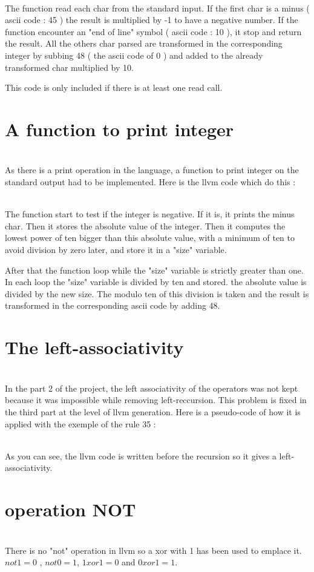 \documentclass[a4paper,10pt]{report}
\begin{document}


\hfill \\
The function read each char from the standard input. If the first char is a minus ( ascii code : 45 ) the result is multiplied by -1 to have a negative number. If the function encounter an "end of line" symbol ( ascii code : 10 ), it stop and return the result. All the others char parsed are transformed in the corresponding integer by subbing 48 ( the ascii code of 0 ) and added to the already transformed char multiplied by 10.

This code is only included if there is at least one read call.

\section*{A function to print integer}

\hfill \\
As there is a print operation in the language, a function to print integer on the standard output had to be implemented. Here is the llvm code which do this :



\hfill \\
The function start to test if the integer is negative. If it is, it prints the minus char. Then it stores the absolute value of the integer. Then it computes the lowest power of ten bigger than this absolute value, with a minimum of ten to avoid division by zero later, and store it in a "size" variable.

After that the function loop while the "size" variable is strictly greater than one. In each loop the "size" variable is divided by ten and stored. the absolute value is divided by the new size. The modulo ten of this division is taken and the result is transformed in the corresponding ascii code by adding 48.

\section*{The left-associativity}

\hfill \\
In the part 2 of the project, the left associativity of the operators was not kept because it was impossible while removing left-reccursion. This problem is fixed in the third part at the level of llvm generation. Here is a pseudo-code of how it is applied with the exemple of the rule 35 :




\hfill \\
As you can see, the llvm code is written before the recursion so it gives a left-associativity.

\section*{operation NOT}

\hfill \\
There is no "not" operation in llvm so a xor with 1 has been used to emplace it.
$ not 1 = 0 $ , $not 0 = 1$, $1 xor 1 = 0$ and $0 xor 1 = 1$.
\end{document}
